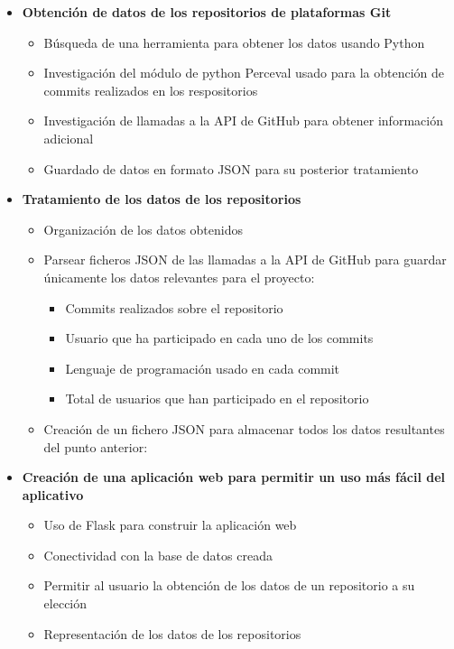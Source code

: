 \documentclass[a4paper, 12pt]{book}
\begin{document}
\begin{itemize}
  \item \textbf{Obtención de datos de los repositorios de plataformas Git}
    \begin {itemize} 
      \item Búsqueda de una herramienta para obtener los datos usando Python
      \item Investigación del módulo de python Perceval usado para la obtención de commits realizados en los respositorios
      \item Investigación de llamadas a la API de GitHub para obtener información adicional
      \item Guardado de datos en formato JSON para su posterior tratamiento
    \end{itemize}
  \item \textbf{Tratamiento de los datos de los repositorios}
    \begin {itemize}
      \item Organización de los datos obtenidos
      \item Parsear ficheros JSON de las llamadas a la API de GitHub para guardar únicamente los datos relevantes para el proyecto:
        \begin{itemize}
          \item Commits realizados sobre el repositorio
          \item Usuario que ha participado en cada uno de los commits
          \item Lenguaje de programación usado en cada commit
          \item Total de usuarios que han participado en el repositorio
        \end{itemize}
      \item Creación de un fichero JSON para almacenar todos los datos resultantes del punto anterior:
    \end{itemize}
  \item \textbf{Creación de una aplicación web para permitir un uso más fácil del aplicativo}
    \begin{itemize}
        \item Uso de Flask para construir la aplicación web
        \item Conectividad con la base de datos creada
        \item Permitir al usuario la obtención de los datos de un repositorio a su elección
        \item Representación de los datos de los repositorios

\end{itemize}
\end{itemize}
\end{document}
